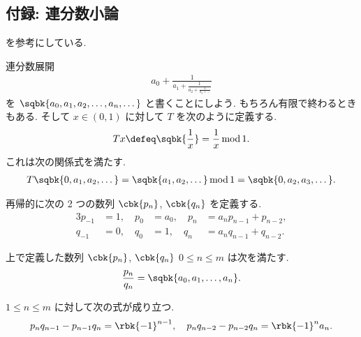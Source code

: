 \documentclass[openany, a4paper, oneside]{jsbook}
\begin{document}
\subsection{付録: 連分数小論\label{introduction-to-ergodic-theory36}}

\cite[Chapter7-8]{JornSteuding1} を参考にしている.

連分数展開
\begin{align}
 a_0 + \frac{1}{a_1 + \frac{1}{a_2 + \frac{1}{a_3 + \dots}}}
\end{align}
を $\sqbk{a_0, a_1, a_2, \dots, a_n, \dots}$ と書くことにしよう.
もちろん有限で終わるときもある.
そして $x \in (0, 1)$ に対して $T$ を次のように定義する.
\begin{align}
 T x
 \defeq
 \sqbk{\frac{1}{x}}
 =
 \frac{1}{x} \, \text{mod} \, 1.
\end{align}
これは次の関係式を満たす.
\begin{align}
 T \sqbk{0, a_1, a_2, \dots}
 =
 \sqbk{a_1, a_2, \dots} \, \text{mod} \, 1
 =
 \sqbk{0, a_2, a_3, \dots}. \label{introduction-to-ergodic-theory35}
\end{align}

再帰的に次の 2 つの数列 $\cbk{p_n}$, $\cbk{q_n}$ を定義する.
\begin{alignat}{3}
 p_{-1}
 &=
 1, \quad
 p_0
 &=
 a_0, \quad
 p_n
 &=
 a_n p_{n-1} + p_{n-2}, \\
 q_{-1}
 &=
 0, \quad
 q_0
 &=
 1, \quad
 q_n
 &=
 a_n q_{n-1} + q_{n-2}.
\end{alignat}
\begin{thm}
上で定義した数列 $\cbk{p_n}$, $\cbk{q_n}$ $0 \leq n \leq m$ は次を満たす.
\begin{align}
 \frac{p_n}{q_n}
 =
 \sqbk{a_0, a_1, \dots, a_n}.
\end{align}
\end{thm}
\begin{thm}\label{introduction-to-ergodic-theory30}
$1 \leq n \leq m$ に対して次の式が成り立つ.
\begin{align}
 p_n q_{n-1} - p_{n-1}q_n
 =
 \rbk{-1}^{n-1}, \quad
 p_n q_{n-2} - p_{n-2} q_n
 =
 \rbk{-1}^n a_n.
\end{align}
\end{thm}
\end{document}
